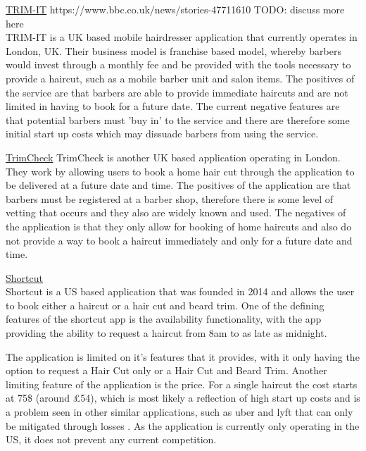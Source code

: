 \documentclass[12pt]{article}
\begin{document}
	
	\noindent
	\underline{TRIM-IT}
	https://www.bbc.co.uk/news/stories-47711610
	TODO: discuss more here
	\\
	TRIM-IT is a UK based mobile hairdresser application that currently operates in London, UK. Their business model is franchise based model, whereby barbers would invest through a monthly fee and be provided with the tools necessary to provide a haircut, such as a mobile barber unit and salon items. The positives of the service are that barbers are able to provide immediate haircuts and are not limited in having to book for a future date. The current negative features are that potential barbers must 'buy in' to the service and there are therefore some initial start up costs which may dissuade barbers from using the service.
	
	\noindent
	\underline{TrimCheck}
	TrimCheck is another UK based application operating in London. They work by allowing users to book a home hair cut through the application to be delivered at a future date and time. The positives of the application are that barbers must be registered at a barber shop, therefore there is some level of vetting that occurs and they also are widely known and used. The negatives of the application is that they only allow for booking of home haircuts and also do not provide a way to book a haircut immediately and only for a future date and time.
	
	\noindent
	\underline{Shortcut}
	\\
	Shortcut is a US based application that was founded in 2014 and allows the user to book either a haircut or a hair cut and beard trim. One of the defining features of the shortcut app is the availability functionality, with the app providing the ability to request a haircut from 8am to as late as midnight.
	
	The application is limited on it's features that it provides, with it only having the option to request a Hair Cut only or a Hair Cut and Beard Trim. 
	Another limiting feature of the application is the price. For a single haircut the cost starts at 75\$ (around £54), which is most likely a reflection of high start up costs and is a problem seen in other similar applications, such as uber and lyft that can only be mitigated through losses \cite{WillRidehailingProfits}. As the application is currently only operating in the US, it does not prevent any current competition.
	\\
	
	
\end{document}
